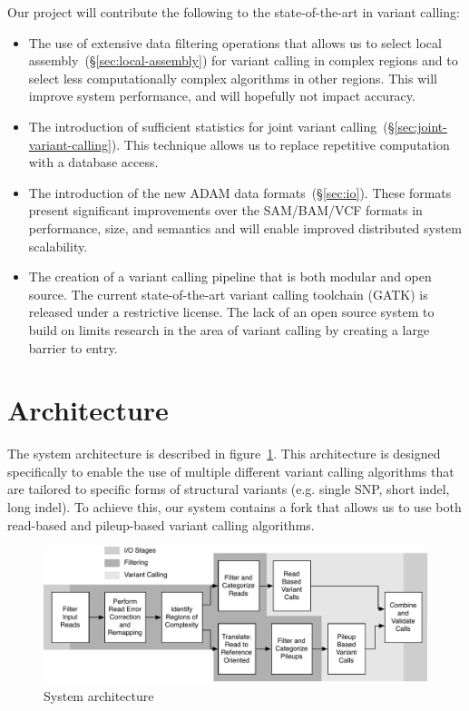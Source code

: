 \documentclass[11pt]{article}
\begin{document}
Our project will contribute the following to the state-of-the-art in variant calling:

\begin{itemize}
\item The use of extensive data filtering operations that allows us to select local assembly~(\S\ref{sec:local-assembly}) for
variant calling in complex regions and to select less computationally complex algorithms in other regions. This will improve
system performance, and will hopefully not impact accuracy.
\item The introduction of sufficient statistics for joint variant calling~(\S\ref{sec:joint-variant-calling}). This technique allows
us to replace repetitive computation with a database access.
\item The introduction of the new ADAM data formats~(\S\ref{sec:io}). These formats present significant improvements over the
SAM/BAM/VCF formats in performance, size, and semantics and will enable improved distributed system scalability.
\item The creation of a variant calling pipeline that is both modular and open source. The current state-of-the-art variant calling
toolchain (GATK) is released under a restrictive license. The lack of an open source system to build on limits research in the area
of variant calling by creating a large barrier to entry.
\end{itemize}

\section{Architecture}
\label{sec:architecture}

The system architecture is described in figure~\ref{fig:architecture}. This architecture is designed specifically to enable
the use of multiple different variant calling algorithms that are tailored to specific forms of structural variants (e.g. single
SNP, short indel, long indel). To achieve this, our system contains a fork that allows us to use both read-based and
pileup-based variant calling algorithms.

\begin{figure}[h]
\begin{center}
\includegraphics[width=0.9\linewidth]{avocado-architecture.pdf}
\end{center}
\caption{System architecture}
\label{fig:architecture}
\end{figure}
\end{document}
